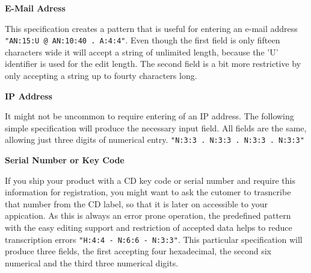 \textbf{E-Mail Adress}

This specification creates a pattern that is useful for entering an
e-mail address \texttt{"AN:15:U @ AN:10:40 . A:4:4"}. Even though the
first field is only fifteen characters wide it will accept a string of
unlimited length, because the 'U' identifier is used for the edit
length. The second field is a bit more restrictive by only accepting a
string up to fourty characters long.\\

\begin{center}
\end{center}

\textbf{IP Address}

It might not be uncommon to require entering of an IP address. The
following simple specification will produce the necessary input field.
All fields are the same, allowing just three digits of numerical entry.
\texttt{"N:3:3 . N:3:3 . N:3:3 . N:3:3"}\\

\begin{center}
\end{center}

\textbf{Serial Number or Key Code}

If you ship your product with a CD key code or serial number and require
this information for registration, you might want to ask the cutomer to
trasncribe that number from the CD label, so that it is later on
accessible to your appication. As this is always an error prone
operation, the predefined pattern with the easy editing support and
restriction of accepted data helps to reduce transcription errors
\texttt{"H:4:4 - N:6:6 - N:3:3"}. This particular specification will
produce three fields, the first accepting four hexadecimal, the second
six numerical and the third three numerical digits.\\

